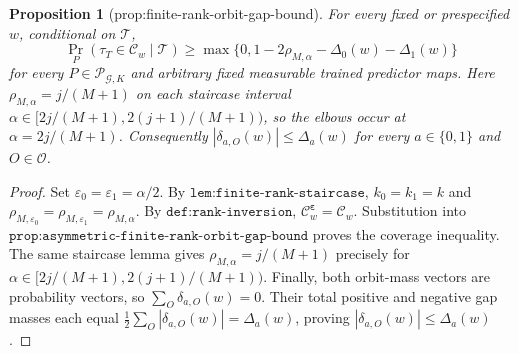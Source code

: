 \documentclass{article}
\newtheorem{proposition}{Proposition}
\begin{document}
\begin{proposition}[prop:finite-rank-orbit-gap-bound]\label{prop:finite-rank-orbit-gap-bound}
For every fixed or prespecified \(w\), conditional on \(\mathcal T\), \[\Pr_P(\tau_T\in\mathcal C_w\mid\mathcal T)\ge\max\{0,1-2\rho_{M,\alpha}-\Delta_0(w)-\Delta_1(w)\}\] for every \(P\in\mathcal P_{\mathcal G,K}\) and arbitrary fixed measurable trained predictor maps. Here \(\rho_{M,\alpha}=j/(M+1)\) on each staircase interval \(\alpha\in[2j/(M+1),2(j+1)/(M+1))\), so the elbows occur at \(\alpha=2j/(M+1)\). Consequently \(|\delta_{a,O}(w)|\le\Delta_a(w)\) for every \(a\in\{0,1\}\) and \(O\in\mathcal O\).
\end{proposition}
\begin{proof}
Set \(\varepsilon_0=\varepsilon_1=\alpha/2\). By \(\texttt{lem:finite-rank-staircase}\), \(k_0=k_1=k\) and \(\rho_{M,\varepsilon_0}=\rho_{M,\varepsilon_1}=\rho_{M,\alpha}\). By \(\texttt{def:rank-inversion}\), \(\mathcal C^{\boldsymbol\varepsilon}_w=\mathcal C_w\). Substitution into \(\texttt{prop:asymmetric-finite-rank-orbit-gap-bound}\) proves the coverage inequality. The same staircase lemma gives \(\rho_{M,\alpha}=j/(M+1)\) precisely for \(\alpha\in[2j/(M+1),2(j+1)/(M+1))\). Finally, both orbit-mass vectors are probability vectors, so \(\sum_O\delta_{a,O}(w)=0\). Their total positive and negative gap masses each equal \(\frac12\sum_O|\delta_{a,O}(w)|=\Delta_a(w)\), proving \(|\delta_{a,O}(w)|\le\Delta_a(w)\).
\end{proof}
\end{document}

